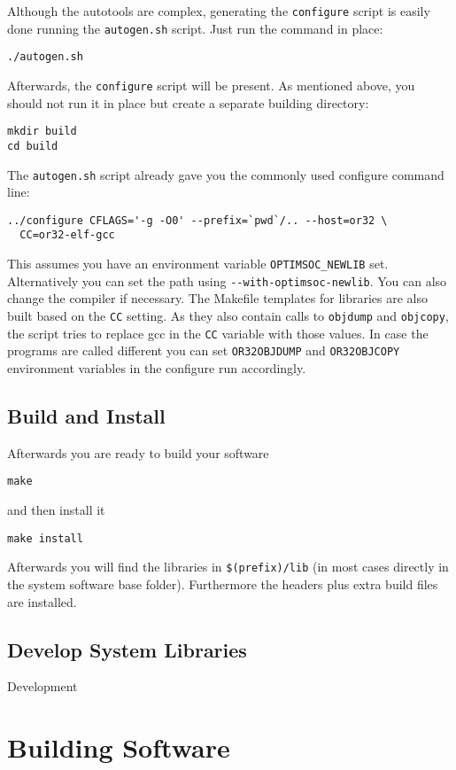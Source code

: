 Although the autotools are complex, generating the \verb|configure|
script is easily done running the \verb|autogen.sh| script. Just run
the command in place:

\begin{lstlisting}
./autogen.sh
\end{lstlisting}

Afterwards, the \verb|configure| script will be present. As mentioned
above, you should not run it in place but create a separate building
directory:

\begin{lstlisting}
mkdir build
cd build
\end{lstlisting}

The \verb|autogen.sh| script already gave you the commonly used
configure command line:

\begin{lstlisting}
../configure CFLAGS='-g -O0' --prefix=`pwd`/.. --host=or32 \
  CC=or32-elf-gcc
\end{lstlisting}

This assumes you have an environment variable \verb|OPTIMSOC_NEWLIB|
set. Alternatively you can set the path using
\verb|--with-optimsoc-newlib|. You can also change the compiler if
necessary. The Makefile templates for libraries are also built based
on the \verb|CC| setting. As they also contain calls to \verb|objdump|
and \verb|objcopy|, the script tries to replace gcc in the \verb|CC|
variable with those values. In case the programs are called different
you can set \verb|OR32OBJDUMP| and \verb|OR32OBJCOPY| environment
variables in the configure run accordingly.

\subsection{Build and Install}

Afterwards you are ready to build your software

\begin{lstlisting}
make
\end{lstlisting}

and then install it

\begin{lstlisting}
make install
\end{lstlisting}

Afterwards you will find the libraries in \verb|$(prefix)/lib| (in
most cases directly in the system software base folder). Furthermore
the headers plus extra build files are installed.

\subsection{Develop System Libraries}

Development

\section{Building Software}